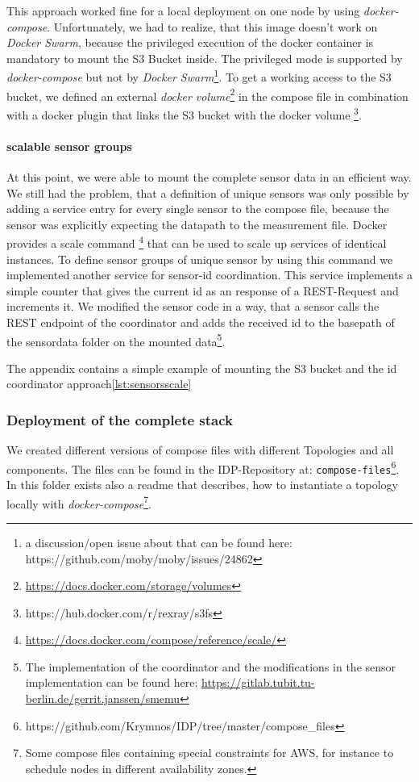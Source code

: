This approach worked fine for a local deployment on one node by using \emph{docker-compose}. Unfortunately, we had to realize, that this image doesn't work on \emph{Docker Swarm}, because the privileged execution of the docker container is mandatory to mount the S3 Bucket inside. The privileged mode is supported by \emph{docker-compose} but not by \emph{Docker Swarm}\footnote{a discussion/open issue about that can be found here: https://github.com/moby/moby/issues/24862}.
To get a working access to the S3 bucket, we defined an external \emph{docker volume}\footnote{\url{https://docs.docker.com/storage/volumes}} in the compose file in combination with a docker plugin that links the S3 bucket with the docker volume \footnote{https://hub.docker.com/r/rexray/s3fs}.

\paragraph*{scalable sensor groups}
At this point, we were able to mount the complete sensor data in an efficient way. We still had the problem, that a definition of unique sensors was only possible by adding a service entry for every single sensor to the compose file, because the sensor was explicitly expecting the datapath to the measurement file.
Docker provides a scale command \footnote{\url{https://docs.docker.com/compose/reference/scale/}} that can be used to scale up services of identical instances. To define sensor groups of unique sensor by using this command we implemented another service for sensor-id coordination. This service implements a simple counter that gives the current id as an response of a REST-Request and increments it.
We modified the sensor code in a way, that a sensor calls the REST endpoint of the coordinator and adds the received id to the basepath of the sensordata folder on the mounted data\footnote{The implementation of the coordinator and the modifications in the sensor implementation can be found here: \url{https://gitlab.tubit.tu-berlin.de/gerrit.janssen/smemu}}. 

The appendix contains a simple example of mounting the S3 bucket and the id coordinator approach\ref{lst:sensorsscale}


\subsubsection*{Deployment of the complete stack}
We created different versions of compose files with different Topologies and all components. The files can be found in the IDP-Repository at: \texttt{compose-files}\footnote{https://github.com/Krymnos/IDP/tree/master/compose\_files}. In this folder exists also a readme that describes, how to instantiate a topology locally  with \emph{docker-compose}\footnote{ Some compose files containing special constraints for AWS, for instance to schedule nodes in different availability zones.}.

